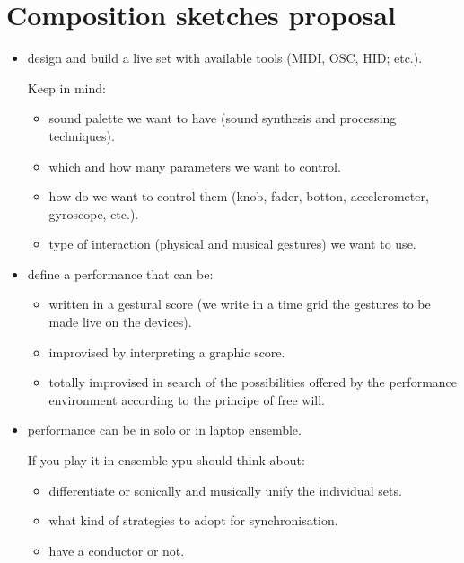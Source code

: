 \section{Composition sketches proposal}\label{composition-sketches-proposal}

\begin{itemize}
\tightlist
\item design and build a live set with available tools (MIDI, OSC, HID; etc.).

      Keep in mind:
      \begin{itemize}
      \tightlist
      \item sound palette  we want to have (sound synthesis and processing techniques).
      \item which and how many parameters we want to control.
      \item how do we want to control them (knob, fader, botton, accelerometer, gyroscope, etc.).
      \item type of interaction (physical and musical gestures) we want to use.
      \end{itemize}
\item define a performance that can be:
      \begin{itemize}
      \tightlist
      \item written in a gestural score (we write in a time grid the gestures to be made live on the devices).
      \item improvised by interpreting a graphic score.
      \item totally improvised in search of the possibilities offered by the performance environment according to the principe of free will.
      \end{itemize}

\item performance can be in solo or in laptop ensemble. 

      If you play it in ensemble ypu should think about:
      \begin{itemize}
      \tightlist
      \item differentiate or sonically and musically unify the individual sets.
      \item what kind of strategies to adopt for synchronisation.
      \item have a conductor or not.
      \end{itemize}
\end{itemize}
